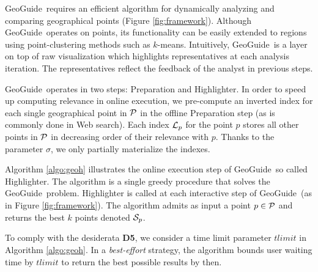 \documentclass{vldb}
\newtheorem{problem}{Problem}
\newcommand{\framework}{{\sc GeoGuide}}
\newcommand{\pb}{{\sc GeoGuide}}
\begin{document}



 \framework\ requires an efficient algorithm for dynamically analyzing and comparing geographical points (Figure \ref{fig:framework}). Although \framework\ operates on points, its functionality can be easily extended to regions using point-clustering methods such as $k$-means. Intuitively, \framework\ is a layer on top of raw visualization which highlights representatives at each analysis iteration. The representatives reflect the feedback of the analyst in previous steps.

 \framework\ operates in two steps: {\sc Preparation} and {\sc Highlighter}. In order to speed up computing relevance in online execution, we pre-compute an inverted index for each single geographical point in ${\cal P}$ in the offline {\sc Preparation} step (as is commonly done in Web search). Each index ${\cal L}_p$ for the point $p$ stores all other points in ${\cal P}$ in decreasing order of their relevance with $p$. Thanks to the parameter $\sigma$, we only partially materialize the indexes.

 Algorithm \ref{algo:geoh} illustrates the online execution step of \framework\, so called {\sc Highlighter}. The algorithm is a single greedy procedure that solves the \pb\ problem. {\sc Highlighter} is called at each interactive step of \framework\ (as in Figure \ref{fig:framework}). The algorithm admits as input a point $p \in {\cal P}$ and returns the best $k$ points denoted ${\cal S}_p$.

To comply with the desiderata {\bf D5}, we consider a time limit parameter $tlimit$ in Algorithm \ref{algo:geoh}. In a {\em best-effort} strategy, the algorithm bounds user waiting time by $tlimit$ to return the best possible results by then.
\end{document}
